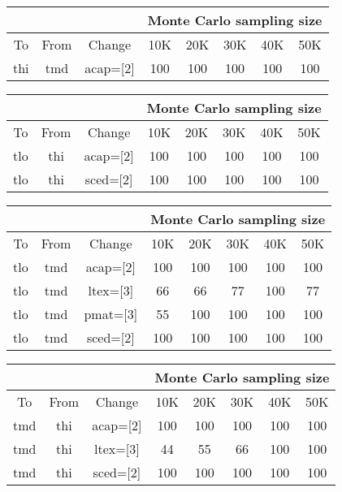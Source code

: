 \begin{center}
\begin{tabular}{|c|c|c|c|c|c|c|c|}\cline{4-8}
\multicolumn{3}{c|}{}&
\multicolumn{5}{c|}{Monte Carlo sampling size}
\\\hline 
To & From & Change & 10K & 20K & 30K & 40K & 50K
\\\hline\hline
thi
& tmd
& acap=[2]
& 100
& 100
& 100
& 100
& 100
\\\hline
\end{tabular}\end{center}
\begin{center}
\begin{tabular}{|c|c|c|c|c|c|c|c|}\cline{4-8}
\multicolumn{3}{c|}{}&
\multicolumn{5}{c|}{Monte Carlo sampling size}
\\\hline 
To & From & Change & 10K & 20K & 30K & 40K & 50K
\\\hline\hline
tlo
& thi
& acap=[2]
& 100
& 100
& 100
& 100
& 100
\\\hline
tlo
& thi
& sced=[2]
& 100
& 100
& 100
& 100
& 100
\\\hline
\end{tabular}\end{center}
\begin{center}
\begin{tabular}{|c|c|c|c|c|c|c|c|}\cline{4-8}
\multicolumn{3}{c|}{}&
\multicolumn{5}{c|}{Monte Carlo sampling size}
\\\hline 
To & From & Change & 10K & 20K & 30K & 40K & 50K
\\\hline\hline
tlo
& tmd
& acap=[2]
& 100
& 100
& 100
& 100
& 100
\\\hline
tlo
& tmd
& ltex=[3]
& 66
& 66
& 77
& 100
& 77
\\\hline
tlo
& tmd
& pmat=[3]
& 55
& 100
& 100
& 100
& 100
\\\hline
tlo
& tmd
& sced=[2]
& 100
& 100
& 100
& 100
& 100
\\\hline
\end{tabular}\end{center}
\begin{center}
\begin{tabular}{|c|c|c|c|c|c|c|c|}\cline{4-8}
\multicolumn{3}{c|}{}&
\multicolumn{5}{c|}{Monte Carlo sampling size}
\\\hline 
To & From & Change & 10K & 20K & 30K & 40K & 50K
\\\hline\hline
tmd
& thi
& acap=[2]
& 100
& 100
& 100
& 100
& 100
\\\hline
tmd
& thi
& ltex=[3]
& 44
& 55
& 66
& 100
& 100
\\\hline
tmd
& thi
& sced=[2]
& 100
& 100
& 100
& 100
& 100
\\\hline
\end{tabular}\end{center}
